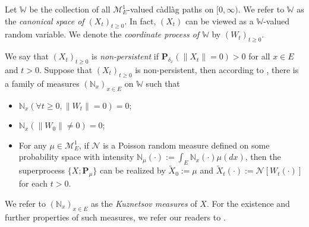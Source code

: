 \documentclass[12pt, a4paper]{amsart}
\theoremstyle{definition}
\numberwithin{equation}{section}
\begin{document}
	Let $\mathbb W$ be the collection of all $\mathcal M^1_E$-valued c\`{a}dl\`{a}g paths on $[0,\infty)$.
	We refer to $\mathbb W$ as the \emph{canonical space of $(X_t)_{t\geq 0}$}.
	In fact, $(X_t)$ can be viewed as a $\mathbb W$-valued random variable.
	We denote the \emph{coordinate process of $\mathbb W$} by $(W_t)_{t\geq 0}$.

	We say that $(X_t)_{t\geq 0}$ is \emph{non-persistent} if $\mathbf P_{\delta_x}(\|X_t\|= 0) > 0$ for all $x\in E$ and $t> 0$.
	Suppose that $(X_t)_{t\geq 0}$ is non-persistent, then according to \cite[Section 8]{Li2011Measure-valued}, there is a family of measures $(\mathbb N_x)_{x\in E}$ on $\mathbb W$ such that
\begin{itemize}
\item
	$\mathbb N_x (\forall t \geq 0, \|W_t\|=0) =0$; 
\item
	$\mathbb N_x(\|W_0 \|\neq 0) = 0$;
\item
	For any $\mu \in \mathcal M_E^1$, if $\mathcal N$ is a Poisson random measure defined on some probability space 
	with intensity $\mathbb N_\mu(\cdot):= \int_E \mathbb N_x(\cdot )\mu(dx)$,
	then the superprocess $\{X;\mathbf P_\mu\}$ can be realized by $\widetilde X_0 := \mu$ and $\widetilde X_t(\cdot) := \mathcal N[W_t(\cdot)]$ for each $t>0$.
\end{itemize}
	We refer to $(\mathbb N_x)_{x\in E}$ as the \emph{Kuznetsov measures} of $X$.
	For the existence and further properties of such measures, we refer our readers to \cite{Li2011Measure-valued}.
\end{document}
